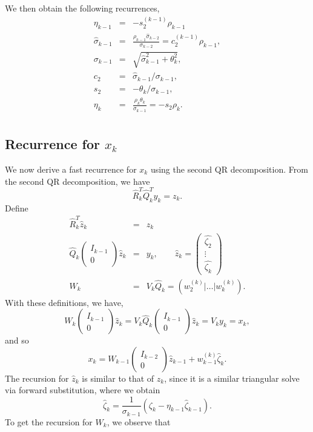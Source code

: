 \documentclass[11pt]{article}
\newcommand{\Ik}{\begin{pmatrix} I_{k-1} \\ 0\end{pmatrix}}
\newcommand{\hQ}{\hat{Q}}
\begin{document}
We then obtain the following recurrences,
\begin{eqnarray}
\eta_{k-1} &=& -s^{(k-1)}_2 \rho_{k-1} \\
\hat{\sigma}_{k-1} &=& \frac{\rho_{k-1}\hat{\sigma}_{k-2}}{\sigma_{k-2}} = c^{(k-1)}_2\rho_{k-1}, \\
\sigma_{k-1} &=& \sqrt{\hat{\sigma}^2_{k-1} + \theta^2_k }, \\
c_2 &=& \hat{\sigma}_{k-1}/\sigma_{k-1}, \\
s_2 &=& -\theta_k/\sigma_{k-1}, \\
\eta_k &=& \frac{\rho_k\theta_k}{\sigma_{k-1}} = -s_2\rho_k. \\
\end{eqnarray}

\subsection{Recurrence for $x_k$}
We now derive a fast recurrence for $x_k$ using the second QR decomposition. From the second QR decomposition, we have
\begin{equation*}
\hat{R}^T_k \hQ^T_k y_k = z_k.
\end{equation*}
Define
\begin{eqnarray}
\hat{R}^T_k \hat{z}_k &=& z_k \\
\hQ_k \Ik \hat{z}_k &=& y_k, \qquad \hat{z}_k = \begin{pmatrix} \hat{\zeta_2} \\ \vdots \\ \hat{\zeta_k} \end{pmatrix}  \\
W_k &=& V_k \hQ_k = (w^{(k)}_2 | \dots | w^{(k)}_{k}).
\end{eqnarray}
With these definitions, we have,
$$ W_k \Ik \hat{z}_k = V_k \hQ_k \Ik \hat{z}_k = V_k y_k = x_k,  $$
and so
$$ x_k = W_{k-1} \begin{pmatrix} I_{k-2} \\ 0\end{pmatrix} \hat{z}_{k-1} + w^{(k)}_{k-1} \hat{\zeta}_k. $$
The recursion for $\hat{z}_k$ is similar to that of $z_k$, since it is a similar triangular solve via forward substitution, where we obtain
\begin{equation}
\hat{\zeta}_k = \frac{1}{\sigma_{k-1}} ( \zeta_k - \eta_{k-1} \hat{\zeta}_{k-1} ).
\end{equation}
To get the recursion for $W_k$, we observe that
\end{document}
